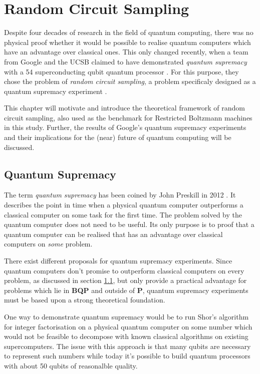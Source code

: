 \chapter{Random Circuit Sampling}

Despite four decades
of research in the field of quantum computing, 
there was no physical proof whether it would be possible to realise quantum computers
which have an advantage over classical ones. This only changed
recently, when a team from Google and the UCSB claimed to have demonstrated \textit{quantum supremacy}
with a 54 superconducting qubit quantum processor \cite{martines2019supremacy}. For this purpose, they
chose the problem of \textit{random circuit sampling}, a problem specificaly designed
as a quantum supremacy experiment \cite{Boixo2018supremacy}.

This chapter will motivate and introduce the theoretical framework of random circuit
sampling, also used as the benchmark for Restricted Boltzmann machines in this
study. Further, the results of Google's quantum supremacy experiments and their
implications for the (near) future of quantum computing will be discussed.

\section{Quantum Supremacy}

The term \textit{quantum supremacy} has been coined by John Preskill in 2012
\cite{preskill2012quantum}. It describes the point in time when a physical quantum computer
outperforms a classical computer on some task for the first time. The problem
solved by the quantum computer does not need to be useful. Its only purpose is
to proof that a quantum computer can be realised that has an advantage over
classical computers on \textit{some} problem.

There exist different proposals for quantum supremacy
experiments. Since quantum computers don't promise to outperform classical
computers on every problem, as discussed in section \ref{}, but only provide a
practical advantage for problems which lie in \textbf{BQP} and outside of
\textbf{P}, quantum supremacy experiments must be based upon a strong theoretical foundation.

One way to demonstrate quantum supremacy would be to run Shor's
algorithm for integer factorisation \cite{shor1997factorisation} on a physical quantum computer on some number which would not be feasible
to decompose with known classical algorithms on existing supercomputers. The issue with this approach is that many
qubits are necessary to represent such numbers while today it's possible to
build quantum processors with about 50 qubits of reasonalble quality.

